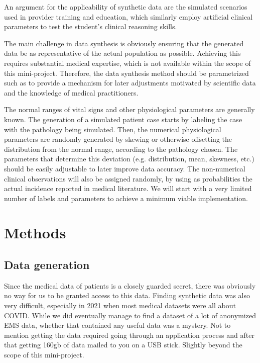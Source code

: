 \documentclass{article}
\begin{document}
An argument for the applicability of synthetic data are the simulated scenarios used in provider training and education, which similarly employ artificial clinical parameters to test the student's clinical reasoning skills.

The main challenge in data synthesis is obviously ensuring that the generated data be as representative of the actual population as possible. Achieving this requires substantial medical expertise, which is not available within the scope of this mini-project. Therefore, the data synthesis method should be parametrized such as to provide a mechanism for later adjustments motivated by scientific data and the knowledge of medical practitioners.

The normal ranges of vital signs and other physiological parameters are generally known. The generation of a simulated patient case starts by labeling the case with the pathology being simulated. Then, the numerical physiological parameters are randomly generated by skewing or otherwise offsetting the distribution from the normal range, according to the pathology chosen. The parameters that determine this deviation (e.g. distribution, mean, skewness, etc.) should be easily adjustable to later improve data accuracy. The non-numerical clinical observations will also be assigned randomly, by using as probabilities the actual incidence reported in medical literature. We will start with a very limited number of labels and parameters to achieve a minimum viable implementation.

\section{Methods}

\subsection{Data generation}
Since the medical data of patients is a closely guarded secret, there was obviously no way for us to be granted access to this data. Finding synthetic data was also very difficult, especially in 2021 when most medical datasets were all about COVID. While we did eventually manage to find a dataset of a lot of anonymized EMS data, whether that contained any useful data was a mystery. Not to mention getting the data required going through an application process and after that getting 160gb of data mailed to you on a USB stick. Slightly beyond the scope of this mini-project.
\end{document}

